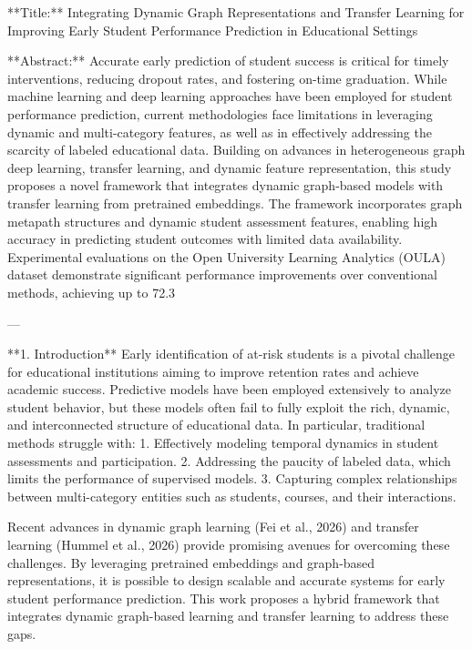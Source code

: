 **Title:**  
Integrating Dynamic Graph Representations and Transfer Learning for Improving Early Student Performance Prediction in Educational Settings

**Abstract:**  
Accurate early prediction of student success is critical for timely interventions, reducing dropout rates, and fostering on-time graduation. While machine learning and deep learning approaches have been employed for student performance prediction, current methodologies face limitations in leveraging dynamic and multi-category features, as well as in effectively addressing the scarcity of labeled educational data. Building on advances in heterogeneous graph deep learning, transfer learning, and dynamic feature representation, this study proposes a novel framework that integrates dynamic graph-based models with transfer learning from pretrained embeddings. The framework incorporates graph metapath structures and dynamic student assessment features, enabling high accuracy in predicting student outcomes with limited data availability. Experimental evaluations on the Open University Learning Analytics (OULA) dataset demonstrate significant performance improvements over conventional methods, achieving up to 72.3%

---

**1. Introduction**  
Early identification of at-risk students is a pivotal challenge for educational institutions aiming to improve retention rates and achieve academic success. Predictive models have been employed extensively to analyze student behavior, but these models often fail to fully exploit the rich, dynamic, and interconnected structure of educational data. In particular, traditional methods struggle with:  
1. Effectively modeling temporal dynamics in student assessments and participation.  
2. Addressing the paucity of labeled data, which limits the performance of supervised models.  
3. Capturing complex relationships between multi-category entities such as students, courses, and their interactions.  

Recent advances in dynamic graph learning (Fei et al., 2026) and transfer learning (Hummel et al., 2026) provide promising avenues for overcoming these challenges. By leveraging pretrained embeddings and graph-based representations, it is possible to design scalable and accurate systems for early student performance prediction. This work proposes a hybrid framework that integrates dynamic graph-based learning and transfer learning to address these gaps.

